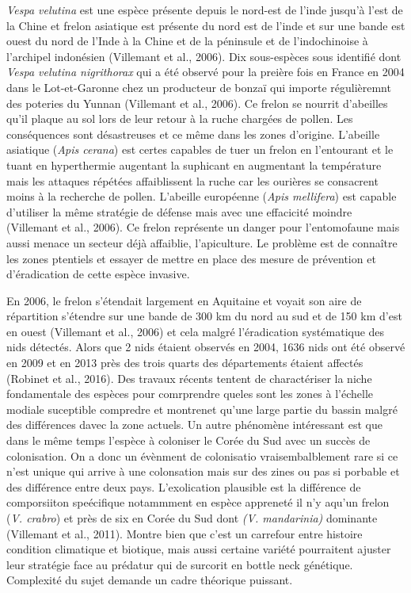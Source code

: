 \emph{Vespa velutina} est une espèce présente depuis le nord-est de
l'inde jusqu'à l'est de la Chine et frelon asiatique est présente du
nord est de l'inde et sur une bande est ouest du nord de l'Inde à la
Chine et de la péninsule et de l'indochinoise à l'archipel indonésien
(Villemant et al., 2006). Dix sous-espèces sous identifié dont
\emph{Vespa velutina nigrithorax} qui a été observé pour la preière fois
en France en 2004 dans le Lot-et-Garonne chez un producteur de bonzaï
qui importe régulièremnt des poteries du Yunnan (Villemant et al.,
2006). Ce frelon se nourrit d'abeilles qu'il plaque au sol lors de leur
retour à la ruche chargées de pollen. Les conséquences sont désastreuses
et ce même dans les zones d'origine. L'abeille asiatique (\emph{Apis
cerana}) est certes capables de tuer un frelon en l'entourant et le
tuant en hyperthermie augentant la suphicant en augmentant la
température mais les attaques répétées affaiblissent la ruche car les
ourières se consacrent moins à la recherche de pollen. L'abeille
européenne (\emph{Apis mellifera}) est capable d'utiliser la même
stratégie de défense mais avec une effacicité moindre (Villemant et al.,
2006). Ce frelon représente un danger pour l'entomofaune mais aussi
menace un secteur déjà affaiblie, l'apiculture. Le problème est de
connaître les zones ptentiels et essayer de mettre en place des mesure
de prévention et d'éradication de cette espèce invasive.

En 2006, le frelon s'étendait largement en Aquitaine et voyait son aire
de répartition s'étendre sur une bande de 300 km du nord au sud et de
150 km d'est en ouest (Villemant et al., 2006) et cela malgré
l'éradication systématique des nids détectés. Alors que 2 nids étaient
observés en 2004, 1636 nids ont été observé en 2009 et en 2013 près des
trois quarts des départements étaient affectés (Robinet et al., 2016).
Des travaux récents tentent de charactériser la niche fondamentale des
espèces pour comrprendre queles sont les zones à l'échelle modiale
suceptible compredre et montrenet qu'une large partie du bassin malgré
des différences davec la zone actuels. Un autre phénomène intéressant
est que dans le même temps l'espèce à coloniser le Corée du Sud avec un
succès de colonisation. On a donc un évènment de colonisatio
vraisembalblement rare si ce n'est unique qui arrive à une colonsation
mais sur des zines ou pas si porbable et des différence entre deux pays.
L'exolication plausible est la différence de comporsiiton speécifique
notammment en espèce appreneté il n'y aqu'un frelon (\emph{V. crabro})
et près de six en Corée du Sud dont \emph{(V. mandarinia)} dominante
(Villemant et al., 2011). Montre bien que c'est un carrefour entre
histoire condition climatique et biotique, mais aussi certaine variété
pourraitent ajuster leur stratégie face au prédatur qui de surcorit en
bottle neck génétique. Complexité du sujet demande un cadre théorique
puissant.

